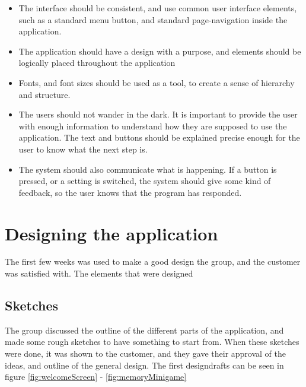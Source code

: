 \begin{itemize}
  \item The interface should be consistent, and use common user interface elements, such as a standard menu button, and standard page-navigation inside the application.  
  
  \item The application should have a design with a purpose, and elements should be logically placed throughout the application
  
  \item Fonts, and font sizes should be used as a tool, to create a sense of hierarchy and structure.
  
  \item The users should not wander in the dark. It is important to provide the user with enough information to understand how they are supposed to use the application. The text and buttons should be explained precise enough for the user to know what the next step is.
  
  \item The system should also communicate what is happening. If a button is pressed, or a setting is switched, the system should give some kind of feedback, so the user knows that the program has responded.
\end{itemize}

\section{Designing the application}
The first few weeks was used to make a good design the group, and the customer was satisfied with. The elements that were designed 

\subsection{Sketches}
The group discussed the outline of the different parts of the application, and made some rough sketches to have something to start from. When these sketches were done, it was shown to the customer, and they gave their approval of the ideas, and outline of the general design. The first designdrafts can be seen in figure \ref{fig:welcomeScreen} - \ref{fig:memoryMinigame}

